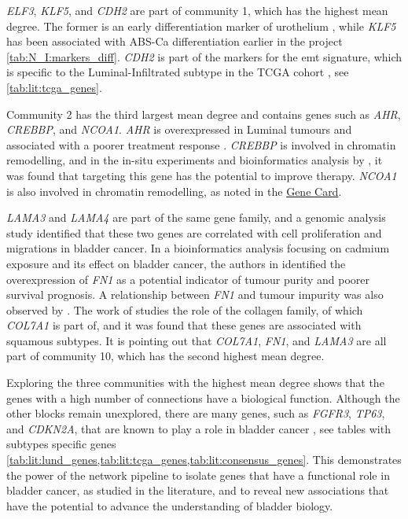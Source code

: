 \textit{ELF3}, \textit{KLF5}, and \textit{CDH2} are part of community 1, which has the highest mean degree. The former is an early differentiation marker of urothelium \citep{Bock2014-zy}, while \textit{KLF5} has been associated with ABS-Ca differentiation earlier in the project \cref{tab:N_I:markers_diff}. \textit{CDH2} is part of the markers for the \acrfull{emt} signature, which is specific to the Luminal-Infiltrated subtype in the TCGA cohort \citep{Robertson2017-mg}, see \cref{tab:lit:tcga_genes}.

Community 2 has the third largest mean degree and contains genes such as \textit{AHR}, \textit{CREBBP}, and \textit{NCOA1}. \textit{AHR} is overexpressed in Luminal tumours \citep{Shi2020-km} and associated with a poorer treatment response \citep{Ma2023-uu}. \textit{CREBBP} is involved in chromatin remodelling, and in the in-situ experiments and bioinformatics analysis by \citep{Duex2018-qg}, it was found that targeting this gene has the potential to improve therapy. \textit{NCOA1} is also involved in chromatin remodelling, as noted in the \href{https://www.uniprot.org/uniprotkb/Q15788/entry#function}{Gene Card}.

\textit{LAMA3} and \textit{LAMA4} are part of the same gene family, and a genomic analysis study  \citep{Ma2024-xc} identified that these two genes are correlated with cell proliferation and migrations in bladder cancer. In a bioinformatics analysis focusing on cadmium exposure and its effect on bladder cancer, the authors in \citep{Zhang2023-ul} identified the overexpression of \textit{FN1} as a potential indicator of tumour purity and poorer survival prognosis. A relationship between \textit{FN1} and tumour impurity was also observed by \citep{Zhang2023-kv}.
The work of \citet{Guo2023-sf} studies the role of the collagen family, of which \textit{COL7A1} is part of, and it was found that these genes are associated with squamous subtypes. It is pointing out that \textit{COL7A1}, \textit{FN1}, and \textit{LAMA3} are all part of community 10, which has the second highest mean degree.


Exploring the three communities with the highest mean degree shows that the genes with a high number of connections have a biological function. Although the other blocks remain unexplored, there are many genes, such as \textit{FGFR3}, \textit{TP63}, and \textit{CDKN2A}, that are known to play a role in bladder cancer \citep{Robertson2017-mg,Kamoun2020-tj,Marzouka2018-ge}, see tables with subtypes specific genes \cref{tab:lit:lund_genes,tab:lit:tcga_genes,tab:lit:consensus_genes}. This demonstrates the power of the network pipeline to isolate genes that have a functional role in bladder cancer, as studied in the literature, and to reveal new associations that have the potential to advance the understanding of bladder biology.

